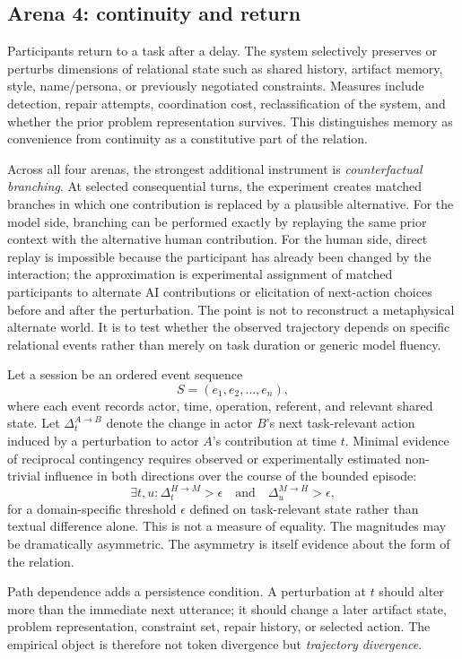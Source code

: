 \documentclass[11pt]{article}
\begin{document}
\subsection{Arena 4: continuity and return}

Participants return to a task after a delay. The system selectively preserves or perturbs dimensions of relational state such as shared history, artifact memory, style, name/persona, or previously negotiated constraints. Measures include detection, repair attempts, coordination cost, reclassification of the system, and whether the prior problem representation survives. This distinguishes memory as convenience from continuity as a constitutive part of the relation.

Across all four arenas, the strongest additional instrument is \emph{counterfactual branching}. At selected consequential turns, the experiment creates matched branches in which one contribution is replaced by a plausible alternative. For the model side, branching can be performed exactly by replaying the same prior context with the alternative human contribution. For the human side, direct replay is impossible because the participant has already been changed by the interaction; the approximation is experimental assignment of matched participants to alternate AI contributions or elicitation of next-action choices before and after the perturbation. The point is not to reconstruct a metaphysical alternate world. It is to test whether the observed trajectory depends on specific relational events rather than merely on task duration or generic model fluency.

Let a session be an ordered event sequence
\[
S = (e_1, e_2, \ldots, e_n),
\]
where each event records actor, time, operation, referent, and relevant shared state. Let $\Delta_t^{A\rightarrow B}$ denote the change in actor $B$'s next task-relevant action induced by a perturbation to actor $A$'s contribution at time $t$. Minimal evidence of reciprocal contingency requires observed or experimentally estimated non-trivial influence in both directions over the course of the bounded episode:
\[
\exists t,u: \Delta_t^{H\rightarrow M} > \epsilon \quad \text{and} \quad \Delta_u^{M\rightarrow H} > \epsilon,
\]
for a domain-specific threshold $\epsilon$ defined on task-relevant state rather than textual difference alone. This is not a measure of equality. The magnitudes may be dramatically asymmetric. The asymmetry is itself evidence about the form of the relation.

Path dependence adds a persistence condition. A perturbation at $t$ should alter more than the immediate next utterance; it should change a later artifact state, problem representation, constraint set, repair history, or selected action. The empirical object is therefore not token divergence but \emph{trajectory divergence}.
\end{document}
